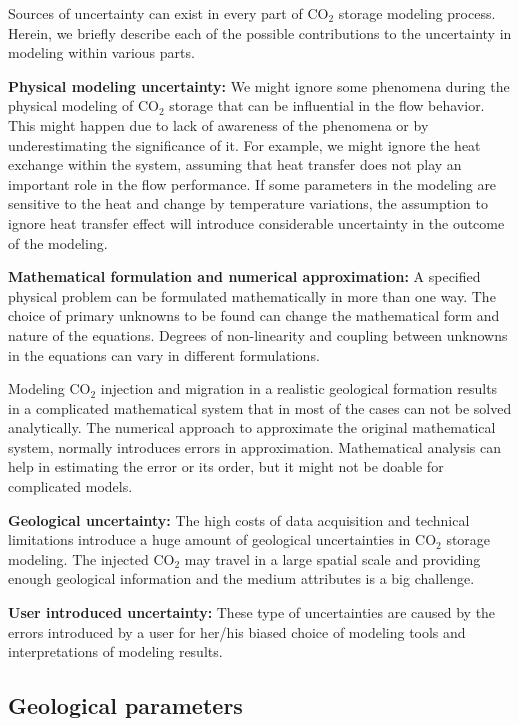 Sources of uncertainty can exist in every part of $\mbox{CO}_2$ storage modeling
process. Herein, we briefly describe each of the possible contributions to the
uncertainty in modeling within various parts.

\textbf{Physical modeling uncertainty:} We might ignore some phenomena during
the physical modeling of $\mbox{CO}_2$ storage that can be influential in the
flow behavior. This might happen due to lack of awareness of the phenomena or by
underestimating the significance of it. For
example, we might ignore the heat exchange within the system, assuming that heat
transfer does not play an important role in the flow performance. If some
parameters in the modeling are sensitive to the heat and change by temperature
variations,
the assumption to ignore heat transfer effect will introduce considerable
uncertainty in
the outcome of the modeling.

\textbf{Mathematical formulation and numerical approximation:} A specified
physical problem can be formulated mathematically in more than one way. The
choice of primary unknowns to be found can change the mathematical form and
nature of the equations. Degrees of non-linearity and coupling between unknowns
in the equations can vary in different formulations. 

Modeling $\mbox{CO}_2$ injection and migration in a realistic geological
formation results in a complicated mathematical system that in most of the cases
can not be solved analytically. The numerical approach to approximate the
original mathematical system, normally introduces errors in approximation.
Mathematical analysis can help in estimating the error or its order, but it
might not be doable for complicated models.

\textbf{Geological uncertainty:} The high costs of data acquisition and
technical
limitations introduce a huge amount of geological uncertainties in $\mbox{CO}_2$
storage modeling. The injected $\mbox{CO}_2$ may travel in a large spatial scale
and providing enough geological information and the medium attributes is a big
challenge.

\textbf{User introduced uncertainty:} These type of uncertainties are caused by
the errors introduced by a user for her/his biased choice of modeling tools and
interpretations of modeling results. 


\subsection{Geological parameters}


